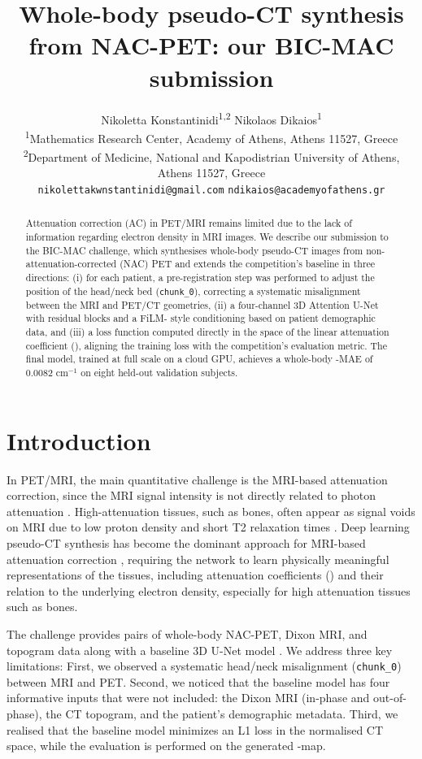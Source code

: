 \documentclass{article}
\title{Whole-body pseudo-CT synthesis from NAC-PET: our BIC-MAC submission}
\author{%
  Nikoletta Konstantinidi\textsuperscript{1,2} \quad
  Nikolaos Dikaios\textsuperscript{1} \\[6pt]
  \normalsize
  \textsuperscript{1}Mathematics Research Center, Academy of Athens, Athens 11527, Greece \\
  \textsuperscript{2}Department of Medicine, National and Kapodistrian University of Athens, Athens 11527, Greece \\[3pt]
  \normalsize\texttt{nikolettakwnstantinidi@gmail.com} \quad \texttt{ndikaios@academyofathens.gr}
}
\begin{document}
\maketitle
\begin{abstract}
Attenuation correction (AC) in PET/MRI remains limited due to the lack of information regarding electron density in MRI images. We describe our submission to the BIC-MAC challenge, which synthesises whole-body pseudo-CT images from non-attenuation-corrected (NAC) PET and extends the competition's baseline in three directions: (i) for each patient, a pre-registration step was performed to adjust the position of the head/neck bed (\texttt{chunk\_0}), correcting a systematic misalignment between the MRI and PET/CT geometries, 
(ii) a four-channel 3D Attention U-Net with residual blocks and a FiLM- style conditioning based on patient demographic data, and 
(iii) a loss function computed directly in the space of the linear attenuation coefficient (\textmu), aligning the training loss with the competition's evaluation metric.
The final model, trained at full scale on a cloud GPU, achieves a whole-body \textmu-MAE of 0.0082 cm$^{-1}$ on eight held-out validation subjects. 
\end{abstract}




\section{Introduction}

In PET/MRI, the main quantitative challenge is the MRI-based attenuation correction, since the MRI signal intensity is not directly related to photon attenuation \cite{hofmann2009towards}. High-attenuation tissues, such as bones, often appear as signal voids on MRI due to low proton density and short T2 relaxation times \cite{hofmann2009towards}. 
Deep learning pseudo-CT synthesis has become the dominant approach for MRI-based attenuation correction \cite{dayarathna2024deep}, requiring the network to learn physically meaningful representations of the tissues, including attenuation coefficients (\textmu) and their relation to the underlying electron density, especially for high attenuation tissues such as bones\cite{ahangari2022deep}. 

The challenge provides pairs of whole-body NAC-PET, Dixon MRI, and topogram data along with a baseline 3D U-Net model \cite{ronneberger2015u}. We address three key limitations: First, we observed a systematic head/neck misalignment (\texttt{chunk\_0}) between MRI and PET. 
Second, we noticed that the baseline model has four informative inputs that were not included: the Dixon MRI (in-phase and out-of-phase), the CT topogram, and the patient's demographic metadata.
Third, we realised that the baseline model minimizes an L1 loss in the normalised CT space, while the evaluation is performed on the generated \textmu-map. 
\end{document}
